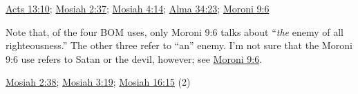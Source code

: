 	\begin{compactdesc}
		\item[enemy of all righteousness] \hyperref[ACTS-13-10]{Acts 13:10}; \hyperref[MOSIAH-2-37]{Mosiah 2:37}; \hyperref[MOSIAH-4-14]{Mosiah 4:14}; \hyperref[ALMA-34-23]{Alma 34:23}; \hyperref[MORONI-9-6]{Moroni 9:6}
			\begin{compactdesc}
				\item[Commentary] Note that, of the four BOM uses, only Moroni 9:6 talks about ``\textit{the} enemy of all righteousness.'' The other three refer to ``an'' enemy. I'm not sure that the Moroni 9:6 use refers to Satan or the devil, however; see \hyperref[MORONI-9-6-NOTE-enemy]{Moroni 9:6}.
			\end{compactdesc}
		\item[enemy to God] \hyperref[MOSIAH-2-38]{Mosiah 2:38}; \hyperref[MOSIAH-3-19]{Mosiah 3:19}; \hyperref[MOSIAH-16-15]{Mosiah 16:15} (2)
	\end{compactdesc}
	


	
	
	
	

	
